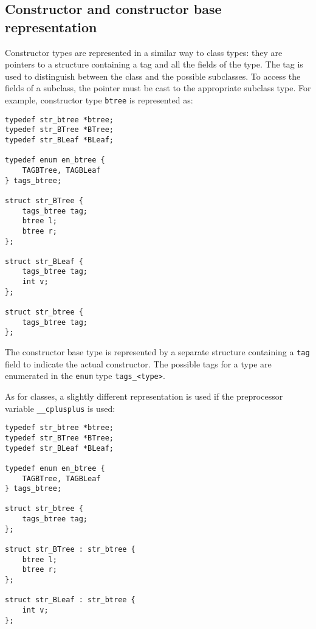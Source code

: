 \subsection{Constructor and constructor base representation}
Constructor types are represented in a similar way to class types:
they are pointers to a structure containing
a tag and all the fields of the type.
The tag is used to distinguish between the class and the possible
subclasses. To access the fields of a subclass, the pointer must
be cast to the appropriate subclass type.
For example, constructor type {\tt btree} is represented as:
\begin{showfile}
\begin{verbatim}
typedef str_btree *btree;
typedef str_BTree *BTree;
typedef str_BLeaf *BLeaf;

typedef enum en_btree {
    TAGBTree, TAGBLeaf
} tags_btree;

struct str_BTree {
    tags_btree tag;
    btree l;
    btree r;
};

struct str_BLeaf {
    tags_btree tag;
    int v;
};

struct str_btree {
    tags_btree tag;
};
\end{verbatim}
\end{showfile}
The constructor base type is represented by a separate structure containing
a {\tt tag} field to indicate the actual constructor.
The possible tags for a type are enumerated in the {\tt enum} type
{\tt tags\_<type>}.
\par
As for classes, a slightly different representation is used if
the preprocessor variable \verb'__cplusplus' is used:
\begin{showfile}
\begin{verbatim}
typedef str_btree *btree;
typedef str_BTree *BTree;
typedef str_BLeaf *BLeaf;

typedef enum en_btree {
    TAGBTree, TAGBLeaf
} tags_btree;

struct str_btree {
    tags_btree tag;
};

struct str_BTree : str_btree {
    btree l;
    btree r;
};

struct str_BLeaf : str_btree {
    int v;
};
\end{verbatim}
\end{showfile}
